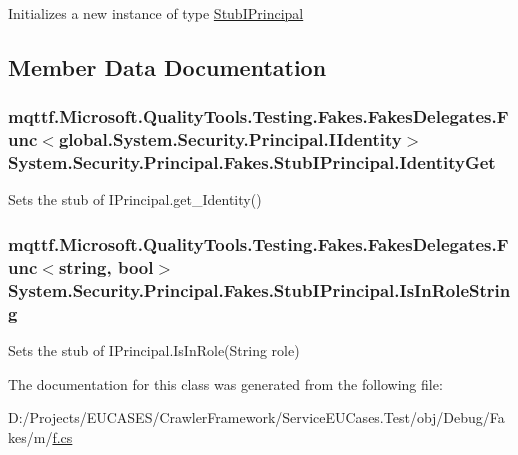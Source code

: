 Initializes a new instance of type \hyperlink{class_system_1_1_security_1_1_principal_1_1_fakes_1_1_stub_i_principal}{Stub\-I\-Principal}



\subsection{Member Data Documentation}
\hypertarget{class_system_1_1_security_1_1_principal_1_1_fakes_1_1_stub_i_principal_a9bd90274d80b7f57fa38b8164150b1be}{
\subsubsection[{Identity\-Get}]{\setlength{\rightskip}{0pt plus 5cm}mqttf.\-Microsoft.\-Quality\-Tools.\-Testing.\-Fakes.\-Fakes\-Delegates.\-Func$<$global.\-System.\-Security.\-Principal.\-I\-Identity$>$ System.\-Security.\-Principal.\-Fakes.\-Stub\-I\-Principal.\-Identity\-Get}}\label{class_system_1_1_security_1_1_principal_1_1_fakes_1_1_stub_i_principal_a9bd90274d80b7f57fa38b8164150b1be}


Sets the stub of I\-Principal.\-get\-\_\-\-Identity()

\hypertarget{class_system_1_1_security_1_1_principal_1_1_fakes_1_1_stub_i_principal_a8e9f77f6e42e78484379baf978625ed1}{
\subsubsection[{Is\-In\-Role\-String}]{\setlength{\rightskip}{0pt plus 5cm}mqttf.\-Microsoft.\-Quality\-Tools.\-Testing.\-Fakes.\-Fakes\-Delegates.\-Func$<$string, bool$>$ System.\-Security.\-Principal.\-Fakes.\-Stub\-I\-Principal.\-Is\-In\-Role\-String}}\label{class_system_1_1_security_1_1_principal_1_1_fakes_1_1_stub_i_principal_a8e9f77f6e42e78484379baf978625ed1}


Sets the stub of I\-Principal.\-Is\-In\-Role(\-String role)



The documentation for this class was generated from the following file\-:\begin{DoxyCompactItemize}
\item 
D\-:/\-Projects/\-E\-U\-C\-A\-S\-E\-S/\-Crawler\-Framework/\-Service\-E\-U\-Cases.\-Test/obj/\-Debug/\-Fakes/m/\hyperlink{m_2f_8cs}{f.\-cs}\end{DoxyCompactItemize}
